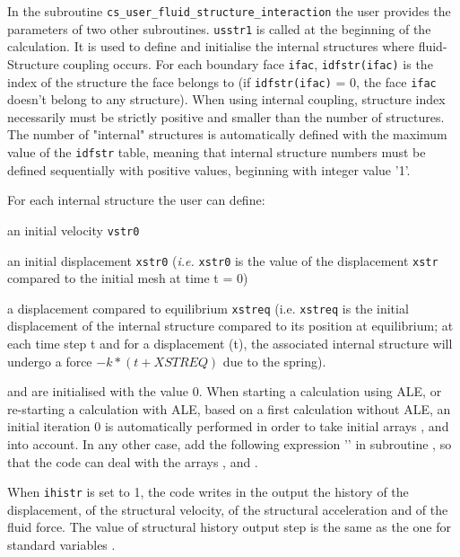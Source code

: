 {{In the subroutine \texttt{cs\_user\_fluid\_structure\_interaction} the user provides the parameters of two other subroutines.
\texttt{usstr1} is called at the beginning of the calculation. It is used to define
 and initialise the internal structures where fluid-Structure coupling occurs.
For each boundary face \texttt{ifac}, \texttt{idfstr(ifac)} is the index of the structure
 the face belongs to (if \texttt{idfstr(ifac)} = 0, the face \texttt{ifac} doesn't belong
 to any structure). When using internal coupling, structure index necessarily must be
 strictly positive and smaller than the number of structures. The number of "internal" structures is automatically defined with the maximum
 value of the \texttt{idfstr} table, meaning that internal structure numbers must be defined
 sequentially with positive values, beginning with integer value '1'.

For each internal structure the user can define:
\begin{list}{-}{}
 \item an initial velocity \texttt{vstr0}
 \item an initial displacement \texttt{xstr0} ({\em i.e.} \texttt{xstr0} is the value of the
 displacement \texttt{xstr} compared to the initial mesh at time t = 0)
 \item a displacement compared to equilibrium  \texttt{xstreq} (i.e. \texttt{xstreq}
 is the initial displacement of the internal structure compared to its position at
 equilibrium; at each time step t and for a displacement (t), the associated
 internal structure will undergo a force $-k*(\text{}t+XSTREQ)$ due to the spring).
\end{list}
 and  are initialised with the value 0.
When starting a calculation using ALE, or re-starting a calculation with ALE, based
 on a first calculation without ALE, an initial iteration 0 is automatically performed
 in order to take initial arrays ,  and  into
 account. In any other case, add the following expression '' in subroutine
 , so that the code can deal with the arrays ,  and .

When \texttt{ihistr} is set to 1, the code writes in the output the history of the
 displacement, of the structural velocity, of the structural acceleration and of the
 fluid force. The value of structural history output step is the same as the one for
 standard variables .

}}
